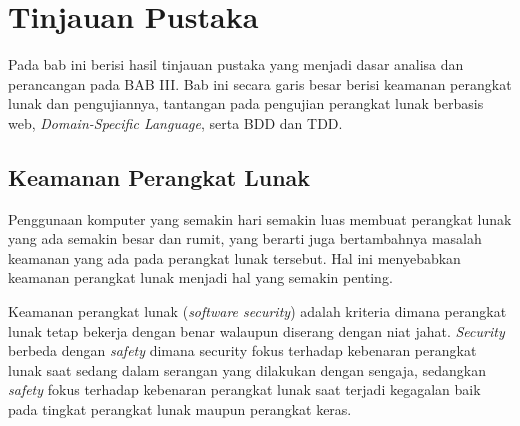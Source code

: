 \chapter{Tinjauan Pustaka}

Pada bab ini berisi hasil tinjauan pustaka yang menjadi dasar analisa dan perancangan pada BAB III.
Bab ini secara garis besar berisi keamanan perangkat lunak dan pengujiannya,
tantangan pada pengujian perangkat lunak berbasis web, \textit{Domain-Specific Language}, serta BDD dan TDD.



\section{Keamanan Perangkat Lunak}

Penggunaan komputer yang semakin hari semakin luas membuat perangkat lunak yang ada semakin besar dan rumit,
yang berarti juga bertambahnya masalah keamanan yang ada pada perangkat lunak tersebut.
Hal ini menyebabkan keamanan perangkat lunak menjadi hal yang semakin penting.

Keamanan perangkat lunak (\textit{software security}) adalah kriteria dimana perangkat lunak tetap bekerja dengan benar
walaupun diserang dengan niat jahat. \textit{Security} berbeda dengan \textit{safety} dimana security fokus terhadap kebenaran
perangkat lunak saat sedang dalam serangan yang dilakukan dengan sengaja, sedangkan \textit{safety} fokus terhadap
kebenaran perangkat lunak saat terjadi kegagalan baik pada tingkat perangkat lunak maupun perangkat keras.

